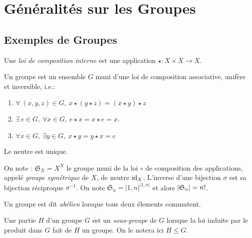 \documentclass{cours}
\begin{document}
\newpage
\section{Généralités sur les Groupes}
\subsection{Exemples de Groupes}
\begin{definition}
    Une \emph{loi de composition interne} est une application $\star : X \times X \rightarrow X$.
\end{definition}
\begin{definition}[Groupe]
    Un groupe est un ensemble $G$ muni d'une loi de composition associative, unifère et inversible, i.e.:
    \begin{enumerate}
        \item $\forall \ (x, y, z) \in G, \ x \star (y \star z) = (x \star y) \star z$
        \item $\exists \ e \in G,\ \forall x \in G, \ e\star x = x \star e = x$.
        \item $\forall x \in G, \ \exists y \in G, \ x \star y = y \star x = e$
    \end{enumerate}
\end{definition}

\begin{remark}
    Le neutre est unique.
\end{remark}

\begin{example}
    On note : $\mathfrak{S}_{X} = X^{X}$ le groupe muni de la loi $\circ$ de composition des applications, appelé \emph{groupe symétrique} de $X$, de neutre $\textmd{id}_{X}$. L'inverse d'une bijection $\sigma$ est sa bijection réciproque $\sigma^{-1}$. On note $\mathfrak{S}_{n} = \lvert 1, n\rvert^{\lvert 1, n\rvert}$ et alors $\left|\mathfrak{S}_{n}\right| = n!$.
\end{example}

\begin{definition}
    Un groupe est dit \emph{abélien} lorsque tous deux élements commutent.
\end{definition}

\begin{definition}
    Une partie $H$ d'un groupe $G$ est un \emph{sous-groupe} de $G$ lorsque la loi induite par le produit dans $G$ fait de $H$ un groupe. On le notera ici $H \leq G$.
\end{definition}
\end{document}
